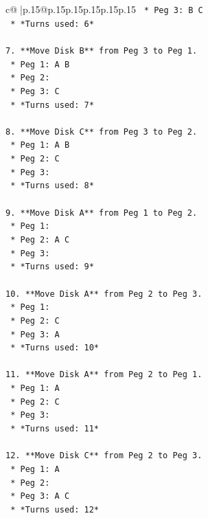 \documentclass{article}
\begin{document}
{\begin{supertabular}{c@{$\;$}|p{.15\linewidth}@{}p{.15\linewidth}p{.15\linewidth}p{.15\linewidth}p{.15\linewidth}p{.15\linewidth}}
{{{\texttt{    *   Peg 3: B C} \\
\texttt{    *   *Turns used: 6*} \\
\\ 
\texttt{7.  **Move Disk B** from Peg 3 to Peg 1.} \\
\texttt{    *   Peg 1: A B} \\
\texttt{    *   Peg 2:} \\
\texttt{    *   Peg 3: C} \\
\texttt{    *   *Turns used: 7*} \\
\\ 
\texttt{8.  **Move Disk C** from Peg 3 to Peg 2.} \\
\texttt{    *   Peg 1: A B} \\
\texttt{    *   Peg 2: C} \\
\texttt{    *   Peg 3:} \\
\texttt{    *   *Turns used: 8*} \\
\\ 
\texttt{9.  **Move Disk A** from Peg 1 to Peg 2.} \\
\texttt{    *   Peg 1:} \\
\texttt{    *   Peg 2: A C} \\
\texttt{    *   Peg 3:} \\
\texttt{    *   *Turns used: 9*} \\
\\ 
\texttt{10. **Move Disk A** from Peg 2 to Peg 3.} \\
\texttt{    *   Peg 1:} \\
\texttt{    *   Peg 2: C} \\
\texttt{    *   Peg 3: A} \\
\texttt{    *   *Turns used: 10*} \\
\\ 
\texttt{11. **Move Disk A** from Peg 2 to Peg 1.} \\
\texttt{    *   Peg 1: A} \\
\texttt{    *   Peg 2: C} \\
\texttt{    *   Peg 3:} \\
\texttt{    *   *Turns used: 11*} \\
\\ 
\texttt{12. **Move Disk C** from Peg 2 to Peg 3.} \\
\texttt{    *   Peg 1: A} \\
\texttt{    *   Peg 2:} \\
\texttt{    *   Peg 3: A C} \\
\texttt{    *   *Turns used: 12*} \\
}}}
\end{supertabular}}
\end{document}
